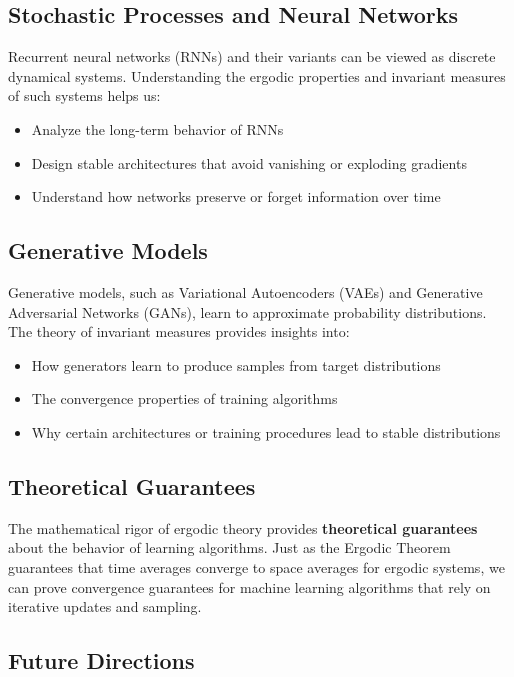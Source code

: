 \documentclass[12pt,a4paper]{article}
\begin{document}
\subsection{Stochastic Processes and Neural Networks}

Recurrent neural networks (RNNs) and their variants can be viewed as discrete dynamical systems. Understanding the ergodic properties and invariant measures of such systems helps us:

\begin{itemize}
    \item Analyze the long-term behavior of RNNs
    \item Design stable architectures that avoid vanishing or exploding gradients
    \item Understand how networks preserve or forget information over time
\end{itemize}

\subsection{Generative Models}

Generative models, such as Variational Autoencoders (VAEs) and Generative Adversarial Networks (GANs), learn to approximate probability distributions. The theory of invariant measures provides insights into:

\begin{itemize}
    \item How generators learn to produce samples from target distributions
    \item The convergence properties of training algorithms
    \item Why certain architectures or training procedures lead to stable distributions
\end{itemize}

\subsection{Theoretical Guarantees}

The mathematical rigor of ergodic theory provides \textbf{theoretical guarantees} about the behavior of learning algorithms. Just as the Ergodic Theorem guarantees that time averages converge to space averages for ergodic systems, we can prove convergence guarantees for machine learning algorithms that rely on iterative updates and sampling.

\subsection{Future Directions}
\end{document}
